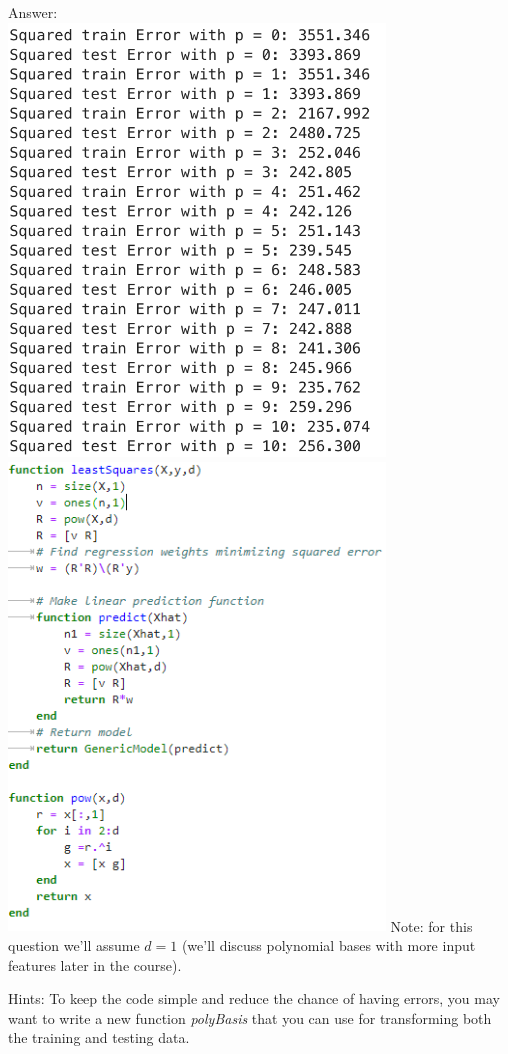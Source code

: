 \documentclass{article}
\def\ans#1{\par\gre{Answer: #1}}
\def\gre#1{{\color{gre}#1}}
\begin{document}
\ans{
    \\ \includegraphics[width=10cm]{Q32new.PNG}
    \\ \includegraphics[width = 10cm]{Q32Code.PNG}
}
Note: for this question we'll assume $d=1$ (we'll discuss polynomial bases with more input features later in the course).

Hints: To keep the code simple and reduce the chance of having errors, you may want to write a new function \emph{polyBasis} that you can use for transforming both the training and testing data. 
\end{document}
